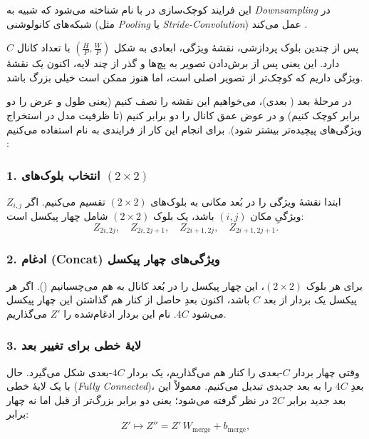 این فرایند کوچک‌سازی در  با نام 
 شناخته می‌شود 
که شبیه به \textit{Downsampling} در شبکه‌های کانولوشنی (مثل \textit{Pooling} یا \textit{Stride-Convolution}) عمل می‌کند \cite{liu2021swintransformer}.

پس از چندین بلوک پردازشی، نقشهٔ ویژگی، ابعادی به شکل \((\tfrac{H}{P}, \tfrac{W}{P})\) با تعداد کانال \(\displaystyle C\) دارد. 
این یعنی پس از برش‌دادن تصویر به پچ‌ها و گذر از چند لایه، اکنون یک نقشهٔ ویژگی داریم که کوچک‌تر از تصویر اصلی است، 
اما هنوز ممکن است خیلی بزرگ باشد.

در مرحلهٔ بعد ( بعدی)، می‌خواهیم این نقشه را نصف کنیم 
(یعنی طول و عرض را دو برابر کوچک کنیم) و در عوض عمق کانال را دو برابر کنیم 
(تا ظرفیت مدل در استخراج ویژگی‌های پیچیده‌تر بیشتر شود). برای انجام این کار از فرایندی به نام 
 استفاده می‌کنیم \cite{liu2021swintransformer}:

\subsubsection{1. انتخاب بلوک‌های \((2 \times 2)\)}
ابتدا نقشهٔ ویژگی را در بُعد مکانی به بلوک‌های \((2 \times 2)\) تقسیم می‌کنیم.  
اگر \(\displaystyle Z_{i,j}\) ویژگیِ مکان \((i, j)\) باشد، 
یک بلوک \((2 \times 2)\) شامل چهار پیکسل است:
\[
Z_{2i, 2j}, \quad Z_{2i, 2j+1}, \quad Z_{2i+1, 2j}, \quad Z_{2i+1, 2j+1}.
\]

\subsubsection{2. ادغام (Concat) ویژگی‌های چهار پیکسل}
برای هر بلوک \((2 \times 2)\)، این چهار پیکسل را در بُعد کانال به هم می‌چسبانیم ().  
اگر هر پیکسل یک بردار از بعد \(\displaystyle C\) باشد، اکنون بعدِ حاصل از کنار هم گذاشتن این چهار پیکسل می‌شود \(\displaystyle 4C\).  
نام این بردار ادغام‌شده را \(\displaystyle Z'\) می‌گذاریم.

\subsubsection{3. لایهٔ خطی برای تغییر بعد}
وقتی چهار بردار \(\displaystyle C\)-بعدی را کنار هم می‌گذاریم، یک بردار \(\displaystyle 4C\)-بعدی شکل می‌گیرد.  
حال با یک لایهٔ خطی (\textit{Fully Connected})، بعدِ \(\displaystyle 4C\) را به بعد جدیدی تبدیل می‌کنیم.  
معمولاً این بعد جدید برابر \(\displaystyle 2C\) در نظر گرفته می‌شود؛ 
یعنی دو برابر بزرگ‌تر از قبل اما نه چهار برابر:
\begin{equation}
	Z' \mapsto Z'' = Z' \, W_{\text{merge}} + b_{\text{merge}},
	\label{eq:merge_transform}
\end{equation}

